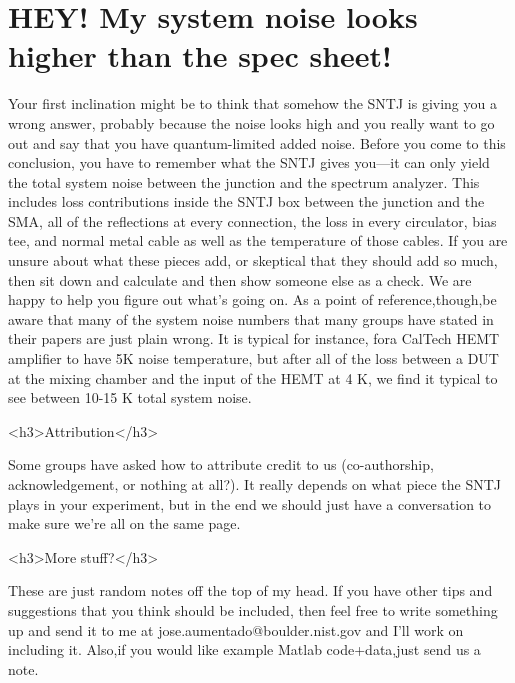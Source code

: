\documentclass[11pt]{article}
\begin{document}
\section{
HEY! My system noise looks higher than the spec sheet!} 




Your ﬁrst inclination might be to think that somehow the SNTJ is giving you a wrong answer, probably because the noise looks high and you really want to go out and say that you have quantum-limited added noise. Before you come to this conclusion, you have to remember what the SNTJ gives you—it can only yield the total system noise between the junction and the spectrum analyzer. This includes loss contributions inside the SNTJ box between the junction and the SMA, all of the reﬂections at every connection, the loss in every circulator, bias tee, and normal metal cable as well as the temperature of those cables. If you are unsure about what these pieces add, or skeptical that they should add so much, then sit down and calculate and then show someone else as a check. We are happy to help you ﬁgure out what’s going on. As a point of reference,though,be aware that many of the system noise numbers that many groups have stated in their papers are just plain wrong.  It is typical for instance, fora CalTech HEMT ampliﬁer to have 5K noise temperature, but after all of the loss between a DUT at the mixing chamber and the input of the HEMT at 4 K, we ﬁnd it typical to see between 10-15 K total system noise.

<h3>Attribution</h3> 



Some groups have asked how to attribute credit to us (co-authorship, acknowledgement, or nothing at all?). It really depends on what piece the SNTJ plays in your experiment, but in the end we should just have a conversation to make sure we’re all on the same page.


<h3>More stuff?</h3> 




These are just random notes oﬀ the top of my head. If you have other tips and suggestions that you think should be included, then feel free to write something up and send it to me at jose.aumentado@boulder.nist.gov and I’ll work on including it. Also,if you would like example Matlab code+data,just send us a note.
\end{document}

